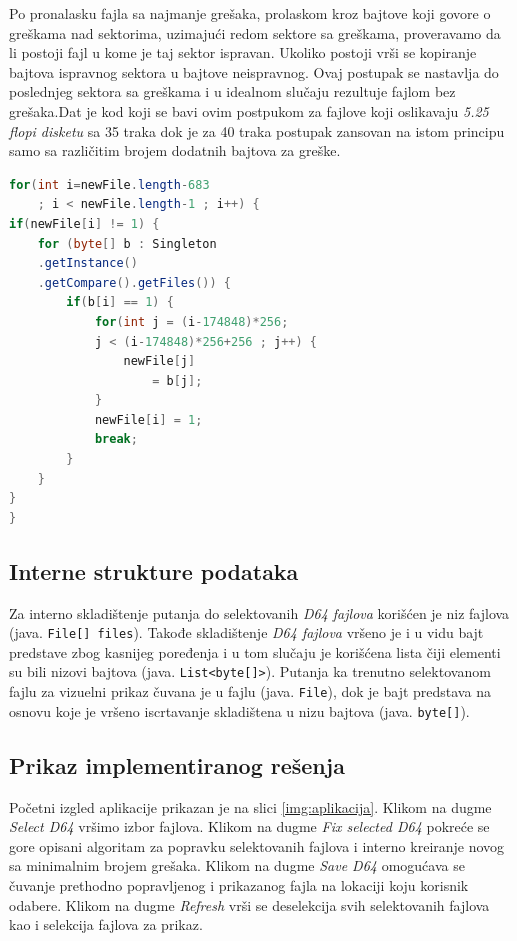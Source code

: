 Po pronalasku fajla sa najmanje grešaka, prolaskom kroz bajtove koji govore o greškama nad sektorima, uzimajući redom sektore sa greškama, proveravamo da li postoji fajl u kome je taj sektor ispravan. Ukoliko postoji vrši se kopiranje bajtova ispravnog sektora u bajtove neispravnog. Ovaj postupak se nastavlja do poslednjeg sektora sa greškama i u idealnom slučaju rezultuje fajlom bez grešaka.Dat je kod koji se bavi ovim postpukom za fajlove koji oslikavaju \textit{5.25 flopi disketu} sa 35 traka dok je za 40 traka postupak zansovan na istom principu samo sa različitim brojem dodatnih bajtova za greške.

\begin{lstlisting}[language=Java]
for(int i=newFile.length-683 
    ; i < newFile.length-1 ; i++) {
if(newFile[i] != 1) {
	for (byte[] b : Singleton
	.getInstance()
	.getCompare().getFiles()) {
		if(b[i] == 1) {
			for(int j = (i-174848)*256;
			j < (i-174848)*256+256 ; j++) {
				newFile[j] 
				    = b[j];
			}
			newFile[i] = 1;
			break;
		}
	}
}
}
\end{lstlisting}

\subsection{Interne strukture podataka}

Za interno skladištenje putanja do selektovanih \textit{D64 fajlova} korišćen je niz fajlova (java. \lstinline{File[] files}). Takođe skladištenje \textit{D64 fajlova} vršeno je i u vidu bajt predstave zbog kasnijeg poređenja i u tom slučaju je korišćena lista čiji elementi su bili nizovi bajtova (java. \lstinline{List<byte[]>}). Putanja ka trenutno selektovanom fajlu za vizuelni prikaz čuvana je u fajlu (java. \lstinline{File}), dok je bajt predstava na osnovu koje je vršeno iscrtavanje skladištena u nizu bajtova (java. \lstinline{byte[]}).

\subsection{Prikaz implementiranog rešenja}

Početni izgled aplikacije prikazan je na slici \ref{img:aplikacija}. Klikom na dugme \textit{Select D64} vršimo izbor fajlova. Klikom na dugme \textit{Fix selected D64} pokreće se gore opisani algoritam za popravku selektovanih fajlova i interno kreiranje novog sa minimalnim brojem grešaka. Klikom na dugme \textit{Save D64} omogućava se čuvanje prethodno popravljenog i prikazanog fajla na lokaciji koju korisnik odabere. Klikom na dugme \textit{Refresh} vrši se deselekcija svih selektovanih fajlova kao i selekcija fajlova za prikaz.


